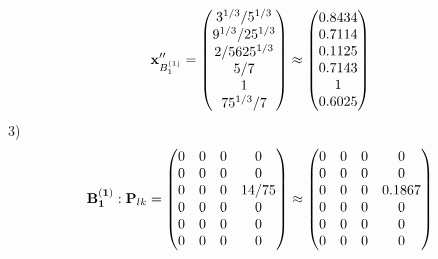 \documentclass[10pt,a4paper]{article}
\begin{document}
	\[
		\bold{x}''_{B_1^{(1)}} = 
		\begin{pmatrix}
			{{3^ {1 / 3}}} / {{5^ {1 / 3}}} \\
			{{9^ {1 / 3}}} / {{25^ {1 / 3}}} \\
			{{2}} / {{5625^ {1 / 3}}} \\
			{{5}} / {{7}} \\
			{1}{} \\
			{{75^ {1 / 3}}} / {{7}} \\
		\end{pmatrix}
		\approx
		\begin{pmatrix}
			0.8434   \\
			0.7114   \\
			0.1125   \\
			0.7143   \\
			1        \\
			0.6025   \\
		\end{pmatrix}
	\]
	3)
	\[
		\bold{B_1^{(1)}}: \bold{P}_{lk} = 
		\begin{pmatrix}
			{{0}}{} & {{0}}{} & {{0}}{} & {{0}}{} \\
			{{0}}{} & {{0}}{} & {{0}}{} & {{0}}{} \\
			{{0}}{} & {{0}}{} & {{0}}{} & {{14}} / {{75}} \\
			{{0}}{} & {{0}}{} & {{0}}{} & {{0}}{} \\
			{{0}}{} & {{0}}{} & {{0}}{} & {{0}}{} \\
			{{0}}{} & {{0}}{} & {{0}}{} & {{0}}{} \\
		\end{pmatrix}
		\approx
		\begin{pmatrix}
			0        & 0        & 0        & 0        \\
			0        & 0        & 0        & 0        \\
			0        & 0        & 0        & 0.1867   \\
			0        & 0        & 0        & 0        \\
			0        & 0        & 0        & 0        \\
			0        & 0        & 0        & 0        \\
		\end{pmatrix}
	\]
\end{document}
